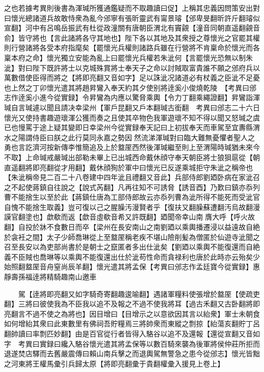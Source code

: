 之也若據考異則後書為渾瑊所獲通鑑疑而不取趣讀曰促】上稱其忠義因問策安出對曰懷光總諸道兵故敢恃衆為亂今邠寧有張昕靈武有甯景璿【邠卑旻翻昕許斤翻璿似宣翻】河中有呂鳴岳振武有杜從政潼關有唐朝臣渭北有竇覦【潼音同朝直遥翻覦音俞】皆守將也【言此諸將各守其地也】陛下各以其地及其衆授之尊懷光之官罷其權則行營諸將各受本府指麾矣【罷懷光兵權則諸路兵雖在行營將不肯稟命於懷光而各稟本府之命】懷光獨立安能為亂上曰罷懷光兵權若朱泚何【言罷懷光恐無以制朱泚】對曰陛下既許將士以克城殊賞將士奉天子之命以討賊取富貴誰不願之邠府兵以萬數借使臣得而將之【將即亮翻又音如字】足以誅泚况諸道必有杖義之臣泚不足憂也上然之丁卯懷光遣其將趙昇鸞入奉天約其夕使别將逹奚小俊燒乾陵　【考異曰邠志作逹奚小進今從實録】令昇鸞為内應以驚脅乘輿【令力丁翻乘繩證翻】昇鸞詣渾瑊自言瑊遽以聞且請决幸梁州【軍戶昆翻又戶本翻瑊古銜翻　考異曰邠志二十六日懷光又使持書趣遊瓌渾公獲而奏之且使其卒物色我軍遊瓌不知不得以聞又怒瑊之虞已也慢罵于途上疑其變即日幸梁州今從實録奉天記曰上初拔奉天而車駕至宜夀縣渭水之陽謂侍臣曰朕之此行莫同永嘉之勢因然流涕渾瑊對曰臨大難無憂懼者聖人之勇也言訖濟河按新傳李惟簡追及上於盩厔西然後渾瑊繼至則上至渭陽時瑊猶未來今不取】上命瑊戒嚴瑊出部勒未畢上已出城西命戴休顔守奉天朝臣將士狼狽扈從【朝直遥翻將即亮翻從才用翻】戴休顔狥於軍中曰懷光已反遂乘城拒守朱泚之稱帝也【朱泚稱帝見二百二十八卷建中四年泚且禮翻又音此】兵部侍郎劉廼卧病在家泚召之不起使蔣鎮自往說之【說式芮翻】凡再往知不可誘脅【誘音酉】乃歎曰鎮亦忝列曹不能捨生以至於此【蔣鎮仕唐為工部侍郎故云亦忝列曹為泚所得不能死而受泚官自愧不能捨生取義】豈可復以己之腥臊汚漫賢者乎【復扶又翻臊蘇遭翻汚烏故翻漫謨官翻塗也】歔欷而返【歔音虛欷音希又許既翻】廼聞帝幸山南膺大呼【呼火故翻】自投於牀不食數日而卒【梁州在長安南山之南劉廼以乘輿播遷浸以益遠故自絶於衾衽之間】太子少師喬琳從上至盩厔稱老疾不堪山險削髪為僧匿於仙遊寺泚聞之召至長安以為吏部尚書於是朝士之竄匿者多出仕泚矣【劉廼以乘輿不能復還而自絶義不臣賊也喬琳等以乘輿不能復還出仕於泚苟性命而貪禄利也唐於此時亦云殆矣少始照翻盩厔音舟窒尚辰羊翻】懷光遣其將孟保【考異曰邠志作孟廷寶今從實録】惠靜壽孫福逹將精騎趣南山邀車

　　駕【逹將即亮翻又如字騎奇寄翻趣逡喻翻】遇諸軍糧料使張增於盩厔【使疏吏翻】三將曰彼使我為不臣我以追不及報之不過不使我將耳【過古禾翻又古卧翻將即亮翻言不過不使之為將也】因目增曰【目增示之以意欲因其言以紿衆】軍士未朝食如何增紿其衆曰此東數里有佛祠吾貯糧焉三將帥衆而東縱之剽掠【紿蕩亥翻貯丁呂翻帥讀曰率剽匹妙翻】由是百官從行者皆得入駱谷以追不及還報【還從宣翻又音如字　考異曰實録曰纔入駱谷懷光遣其將孟保等以數百騎來襲為後軍將侯仲莊所拒而退遂焚店驛而去舊嚴震傳曰賴山南兵擊之而退輿駕無警急之患今從邠志】懷光皆黜之河東將王權馬彚引兵歸太原【將即亮翻彚于貴翻權彚入援見上卷上】


